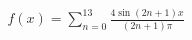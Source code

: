 \documentclass[preview]{standalone}
\begin{document}
\begin{align*}
f(x) = \sum_{n=0}^{13} \frac{4 \sin (2n + 1)x }{ (2n + 1) \pi}
\end{align*}
\end{document}
